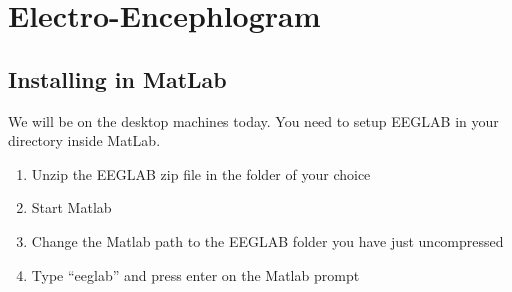\chapter{Electro-Encephlogram}

\section{Installing in MatLab}
We will be on the desktop machines today.  You need to setup EEGLAB in your directory inside MatLab.  

\begin{enumerate}
\item Unzip the EEGLAB zip file in the folder of your choice
\item Start Matlab
\item Change the Matlab path to the EEGLAB folder you have just uncompressed
\item Type ``eeglab'' and press enter on the Matlab prompt
\end{enumerate}

